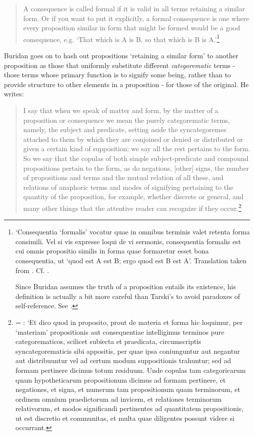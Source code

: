 \documentclass[a4paper, 11pt]{article}
\begin{document}
\begin{quote}
A consequence is called formal if it is valid in all terms retaining a similar form. Or if you want to put it explicitly, a formal consequence is one where every proposition similar in form that might be formed would be a good consequence, e.g. `That which is A is B, so that which is B is A.'\footnote{\autocite[23-24]{BuridanTC}`Consequentia `formalis' vocatur quae in omnibus terminis valet retenta forma consimili. Vel si vis expresse loqui de vi sermonis, consequentia formalis est cui omnis propositio similis in forma quae formaretur esset bona consequentia, ut `quod est A est B; ergo quod est B est A'. Translation taken from \autocite[68]{Buridan2015}. Cf. \autocite[105]{Pseudo-Scotus1891}. 

Since Buridan assumes the truth of a proposition entails its existence, his definition is actually a bit more careful than Tarski's to avoid paradoxes of self-reference. See \autocite{Klima2004,DutilhNovaes2005}.}
\end{quote}

Buridan goes on to hash out propositions `retaining a similar form' to another proposition as those that uniformly substitute different \emph{categorematic} terms - those terms whose primary function is to signify some being, rather than to provide structure to other elements in a proposition - for those of the original. He writes: 
\begin{quote}
	I say that when we speak of matter and form, by the matter of a proposition or consequence we mean the purely categorematic terms, namely, the subject and predicate, setting aside the syncategoremes attached to them by which they are conjoined or denied or distributed or given a certain kind of supposition; we say all the rest pertains to the form. So we say that the copulas of both simple subject-predicate and compound propositions pertain to the form, as do negations, [other] signs, the number of propositions and terms and the mutual relation of all these, and relations of anaphoric terms and modes of signifying pertaining to the quantity of the proposition, for example, whether discrete or general, and many other things that the attentive reader can recognize if they occur.\footnote{\autocite[74]{Buridan2015} = \autocite[30.7-18]{BuridanTC}: `Et dico quod in proposito, prout de materia et forma hic loquimur, per `materiam' propositionis aut consequentiae intelligimus terminos pure categorematicos, scilicet subiecta et praedicata, circumscriptis syncategorematicis sibi appositis, per quae ipsa coniunguntur aut negantur aut distribuuntur vel ad certum modum suppositionis trahuntur; sed ad formam pertinere dicimus totum residuum. Unde copulas tam categoricarum quam hypotheticarum propositionum dicimus ad formam pertinere, et negationes, et signa, et numerum tam propositionum quam terminorum, et ordinem omnium praedictorum ad invicem, et relationes terminorum relativorum, et modos significandi pertinentes  ad quantitatem propositionis, ut est discretio et communitas, et multa quae diligentes possunt videre si occurrant.}
\end{quote}  
\end{document}
